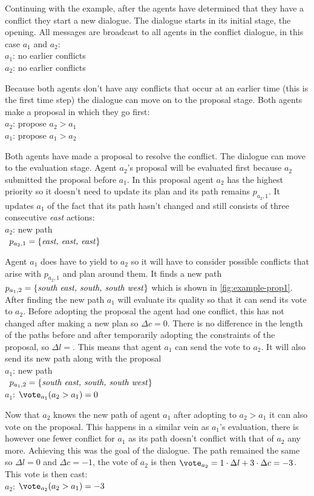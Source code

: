 Continuing with the example, after the agents have determined that they have a
conflict they start a new dialogue. The dialogue starts in its initial stage,
the opening. All messages are broadcast to all agents in the conflict dialogue,
in this case $a_1$ and $a_2$:
\\ \-\qquad $a_1$: no earlier conflicts
\\ \-\qquad $a_2$: no earlier conflicts

Because both agents don't have any conflicts that occur at an earlier time
(this is the first time step) the dialogue can move on to the proposal stage.
Both agents make a proposal in which they go first:
\\ \-\qquad $a_2$: propose $a_2 > a_1$
\\ \-\qquad $a_1$: propose $a_1 > a_2$

Both agents have made a proposal to resolve the conflict. The dialogue can
move to the evaluation stage. Agent $a_2$'s proposal will be evaluated first
because $a_2$ submitted the proposal before $a_1$. In this proposal agent $a_2$
has the highest priority so it doesn't need to update its plan and its path
remains $p_{a_2,1}$. It updates $a_1$ of the fact that its path hasn't changed
and still consists of three consecutive \emph{east} actions:
\\ \-\qquad $a_2$: new path
\\ \-\qquad\quad\,\; $p_{a_2,1} = \{\text{\emph{east, east, east}}\}$

Agent $a_1$ does have to yield to $a_2$ so it will have to consider possible
conflicts that arise with $p_{a_2,1}$ and plan around them. It finds a new path
$p_{a_1,2} = \{\text{\emph{south east, south, south west}}\}$ which is shown in
\autoref{fig:example-prop1}. After finding the new path $a_1$ will evaluate its
quality so that it can send its vote to $a_2$. Before adopting the proposal the
agent had one conflict, this has not changed after making a new plan so $\Delta
c = 0$. There is no difference in the length of the paths before and after
temporarily adopting the constraints of the proposal, so $\Delta l = $. This
means that agent $a_1$ can send the vote to $a_2$. It will also send its new
path along with the proposal
\\ \-\qquad $a_1$: new path
\\ \-\qquad\quad\,\; $p_{a_1,2} = \{\text{\emph{south east, south,
south west}}\}$
\\ \-\qquad $a_1$: $\vote_{a_1}(a_2 > a_1) = 0$

Now that $a_2$ knows the new path of agent $a_1$ after adopting to $a_2 > a_1$
it can also vote on the proposal. This happens in a similar vein as $a_1$'s
evaluation, there is however one fewer conflict for $a_1$ as its path doesn't
conflict with that of $a_2$ any more. Achieving this was the goal of the
dialogue. The path remained the same so $\Delta l = 0$ and $\Delta c = -1$, the
vote of $a_2$ is then $\vote_{a_2} = 1 \cdot \Delta l + 3 \cdot \Delta c = -3$.
This vote is then cast:
\\ \-\qquad $a_2$: $\vote_{a_2}(a_2 > a_1) = -3$

